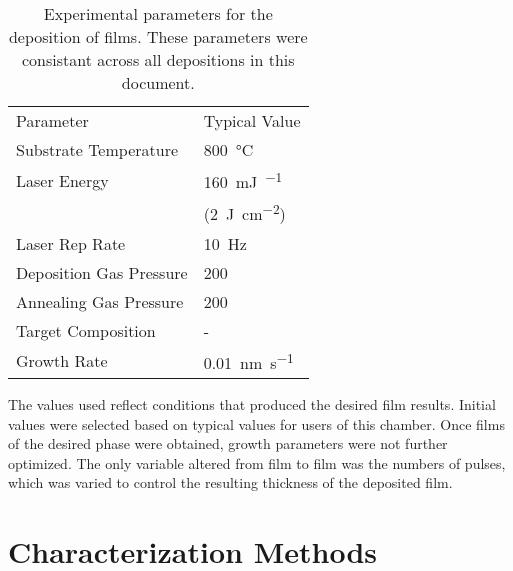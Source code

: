\begin{table}
\begin{center}
	\begin{tabular}{ll}

		Parameter &  
		Typical Value   \\
		
		\cmidrule(lr){1-1}
		\cmidrule(lr){2-2}
		
   		Substrate Temperature & 
		800~\si{\degreeCelsius} \\
		
  		Laser Energy & 
		160~\si{\milli\joule\per\pulse}  \\
		
		&
		(2~\si{\joule\per\centi\meter\squared}) \\
		
		Laser Rep Rate & 
		10~\si{\hertz} \\
		
		Deposition Gas Pressure & 
		200~\si{\milli\torr} \\
		
		Annealing Gas Pressure & 
		200~\si{\torr} \\
		
		Target Composition & 
		\textalpha-\ce{Fe2O3} \\
		
		Growth Rate & 
		0.01~\si{\nano\meter\per\second} \\

	\end{tabular}
	\end{center}
  	\caption[Experimental parameters for  film deposition]{%
		Experimental parameters for the deposition of  films. 
		These parameters were consistant across all depositions in this 
		document.}
	\label{tab:pldparameters}
\end{table}

The values used reflect conditions that produced the desired film results. Initial values were selected based on typical values for users of this  chamber. Once films of the desired phase were obtained, growth parameters were not further optimized. The only variable altered from film to film was the numbers of pulses, which was varied to control the resulting thickness of the deposited film.


\section{Characterization Methods}
\label{sec:exp.characterization}


